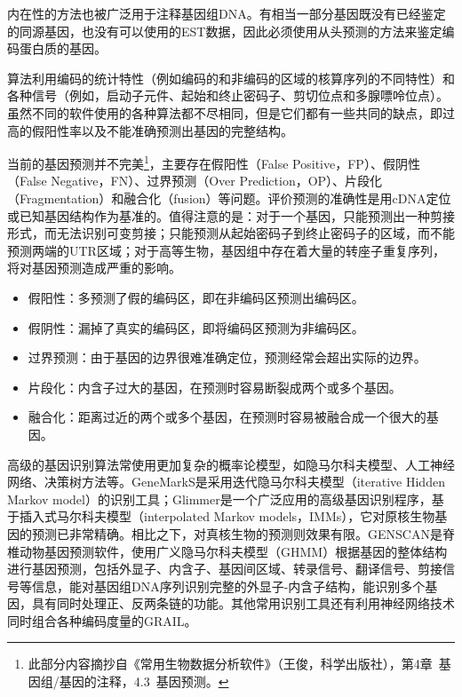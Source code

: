 \documentclass[11pt,a4paper,twoside]{book}
\begin{document}
内在性的方法也被广泛用于注释基因组DNA。有相当一部分基因既没有已经鉴定的同源基因，也没有可以使用的EST数据，因此必须使用从头预测的方法来鉴定编码蛋白质的基因。

算法利用编码的统计特性（例如编码的和非编码的区域的核算序列的不同特性）和各种信号（例如，启动子元件、起始和终止密码子、剪切位点和多腺嘌呤位点）。虽然不同的软件使用的各种算法都不尽相同，但是它们都有一些共同的缺点，即过高的假阳性率以及不能准确预测出基因的完整结构。

当前的基因预测并不完美\footnote{此部分内容摘抄自《常用生物数据分析软件》（王俊，科学出版社），第4章\ 基因组/基因的注释，4.3\ 基因预测。}，主要存在假阳性（False Positive，FP）、假阴性（False Negative，FN）、过界预测（Over Prediction，OP）、片段化（Fragmentation）和融合化（fusion）等问题。评价预测的准确性是用cDNA定位或已知基因结构作为基准的。值得注意的是：对于一个基因，只能预测出一种剪接形式，而无法识别可变剪接；只能预测从起始密码子到终止密码子的区域，而不能预测两端的UTR区域；对于高等生物，基因组中存在着大量的转座子重复序列，将对基因预测造成严重的影响。
\begin{itemize}
  \item 假阳性：多预测了假的编码区，即在非编码区预测出编码区。
  \item 假阴性：漏掉了真实的编码区，即将编码区预测为非编码区。
  \item 过界预测：由于基因的边界很难准确定位，预测经常会超出实际的边界。
  \item 片段化：内含子过大的基因，在预测时容易断裂成两个或多个基因。
  \item 融合化：距离过近的两个或多个基因，在预测时容易被融合成一个很大的基因。
\end{itemize}

高级的基因识别算法常使用更加复杂的概率论模型，如隐马尔科夫模型、人工神经网络、决策树方法等。GeneMarkS是采用迭代隐马尔科夫模型（iterative Hidden Markov model）的识别工具；Glimmer是一个广泛应用的高级基因识别程序，基于插入式马尔科夫模型（interpolated Markov models，IMMs），它对原核生物基因的预测已非常精确。相比之下，对真核生物的预测则效果有限。GENSCAN是脊椎动物基因预测软件，使用广义隐马尔科夫模型（GHMM）根据基因的整体结构进行基因预测，包括外显子、内含子、基因间区域、转录信号、翻译信号、剪接信号等信息，能对基因组DNA序列识别完整的外显子-内含子结构，能识别多个基因，具有同时处理正、反两条链的功能。其他常用识别工具还有利用神经网络技术同时组合各种编码度量的GRAIL。
\end{document}
